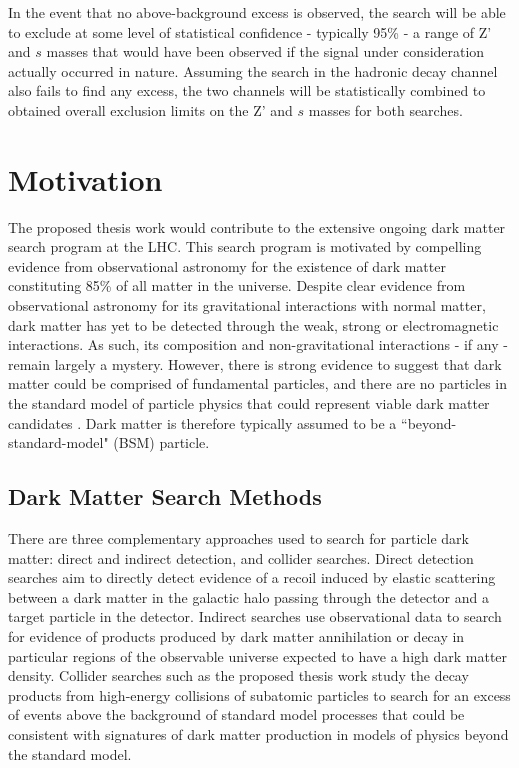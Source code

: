 \documentclass[12pt]{article}
\begin{document}
In the event that no above-background excess is observed, the search will be able to exclude at some level of statistical confidence - typically 95\% - a range of  Z' and $s$ masses that would have been observed if the signal under consideration actually occurred in nature. Assuming the search in the hadronic decay channel also fails to find any excess, the two channels will be statistically combined to obtained overall exclusion limits on the Z' and $s$ masses for both searches. 

\section{Motivation}

The proposed thesis work would contribute to the extensive ongoing dark matter search program at the LHC. This search program is motivated by compelling evidence from observational astronomy for the existence of dark matter constituting 85\% \cite{planck} of all matter in the universe. Despite clear evidence from observational astronomy for its gravitational interactions with normal matter, dark matter has yet to be detected through the weak, strong or electromagnetic interactions. As such, its composition and non-gravitational interactions - if any - remain largely a mystery. However, there is strong evidence to suggest that dark matter could be comprised of fundamental particles, and there are no particles in the standard model of particle physics that could represent viable dark matter candidates \cite{feng}. Dark matter is therefore typically assumed to be a ``beyond-standard-model" (BSM) particle. 

\subsection{Dark Matter Search Methods}
There are three complementary approaches used to search for particle dark matter: direct and indirect detection, and collider searches. Direct detection searches \cite{Schumann_2019, 2015gya} aim to directly detect evidence of a recoil induced by elastic scattering between a dark matter in the galactic halo passing through the detector and a target particle in the detector. Indirect searches \cite{CIRELLI_2012, conrad} use observational data to search for evidence of products produced by dark matter annihilation or decay in particular regions of the observable universe expected to have a high dark matter density. Collider searches \cite{DM_colliders} such as the proposed thesis work study the decay products from high-energy collisions of subatomic particles to search for an excess of events above the background of standard model processes that could be consistent with signatures of dark matter production in models of physics beyond the standard model.
\end{document}
